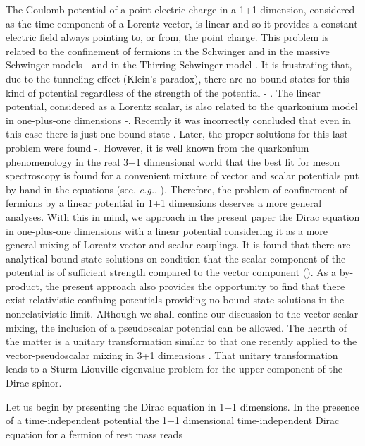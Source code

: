 \documentclass[a4paper,12pt,titlepage]{article}
\begin{document}
The Coulomb potential of a point electric charge in a 1+1 dimension,
considered as the time component of a Lorentz vector, is linear and so it
provides a constant electric field always pointing to, or from, the point
charge. This problem is related to the confinement of fermions in the
Schwinger and in the massive Schwinger models \cite{col1}-\cite{col2} and in
the Thirring-Schwinger model \cite{fro}. It is frustrating that, due to the
tunneling effect (Klein\'{}s paradox), there are no bound states for this
kind of potential regardless of the strength of the potential \cite{cap}-%
\cite{gal}. The linear potential, considered as a Lorentz scalar, is also
related to the quarkonium model in one-plus-one dimensions \cite{hoo}-\cite
{kog}. Recently it was incorrectly concluded that even in this case there
is just one bound state \cite{bha}.
Later, the proper solutions for this last problem were found \cite{cas}-\cite
{hil}. However, it is well known from the quarkonium phenomenology in the
real 3+1 dimensional world that the best fit for meson spectroscopy is found
for a convenient mixture of vector and scalar potentials put by hand in the
equations (see, \textit{e.g.}, \cite{luc}). Therefore, the problem of
confinement of fermions by a linear potential in 1+1 dimensions deserves a
more general analyses. With this in mind, we approach in the present paper
the Dirac equation in one-plus-one dimensions with a linear potential
considering it as a more general mixing of Lorentz vector and scalar
couplings. It is found that there are analytical bound-state solutions on
condition that the scalar component of the potential is of sufficient
strength compared to the vector component (\coordHE{}). As a
by-product, the present approach also provides the opportunity to find that
there exist relativistic confining potentials providing no bound-state
solutions in the nonrelativistic limit. Although we shall confine our
discussion to the vector-scalar mixing, the inclusion of a pseudoscalar
potential can be allowed. The hearth of the matter is a unitary
transformation similar to that one recently applied to the
vector-pseudoscalar mixing in 3+1 dimensions \cite{vai}. That unitary
transformation leads to a Sturm-Liouville eigenvalue problem for the upper
component of the Dirac spinor.

Let us begin by presenting the Dirac equation in 1+1 dimensions. In the
presence of a time-independent potential the 1+1 dimensional
time-independent Dirac equation for a fermion of rest mass \coordHE{} reads
\end{document}
